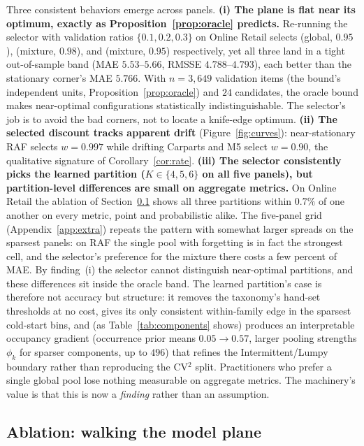 \documentclass[twocolumn,10pt]{article}
\begin{document}
Three consistent behaviors emerge across panels. \textbf{(i) The plane is flat near its
optimum, exactly as Proposition~\ref{prop:oracle} predicts.} Re-running
the selector with validation ratios $\{0.1,0.2,0.3\}$ on Online Retail
selects (global, $0.95$), (mixture, $0.98$), and (mixture, $0.95$)
respectively, yet all three land in a tight out-of-sample band (MAE
$5.53$--$5.66$, RMSSE $4.788$--$4.793$), each better than the
stationary corner's MAE $5.766$. With $n=3{,}649$ validation items (the
bound's independent units, Proposition~\ref{prop:oracle}) and $24$
candidates, the oracle bound makes near-optimal
configurations statistically indistinguishable. The selector's job is to
avoid the bad corners, not to locate a knife-edge optimum.
\textbf{(ii) The selected discount tracks apparent drift}
(Figure~\ref{fig:curves}): near-stationary RAF selects $w{=}0.997$ while
drifting Carparts and M5 select $w{=}0.90$, the qualitative signature of
Corollary~\ref{cor:rate}. \textbf{(iii) The selector consistently picks
the learned partition ($K\in\{4,5,6\}$ on all five panels), but
partition-level differences are small on aggregate metrics.} On Online Retail the
ablation of Section~\ref{sec:ablation} shows all three partitions within
$0.7\%$ of one another on every metric, point and probabilistic alike.
The five-panel grid (Appendix~\ref{app:extra}) repeats the pattern with
somewhat larger spreads on the sparsest panels: on RAF the single pool
with forgetting is in fact the strongest cell, and the selector's
preference for the mixture there costs a few percent of MAE. By
finding~(i) the selector cannot distinguish near-optimal partitions, and
these differences sit inside the oracle band. The
learned partition's case is therefore not accuracy but structure: it
removes the taxonomy's hand-set thresholds at no cost, gives its only
consistent within-family edge in the sparsest cold-start bins, and (as
Table~\ref{tab:components} shows) produces an interpretable occupancy
gradient (occurrence prior means $0.05\to0.57$, larger pooling strengths
$\phi_k$ for sparser components, up to $496$) that refines the
Intermittent/Lumpy boundary rather than reproducing the CV$^2$ split.
Practitioners who prefer a single global pool lose nothing measurable on
aggregate metrics. The machinery's value is that this is now a
\emph{finding} rather than an assumption.

\subsection{Ablation: walking the model plane}\label{sec:ablation}
\end{document}
